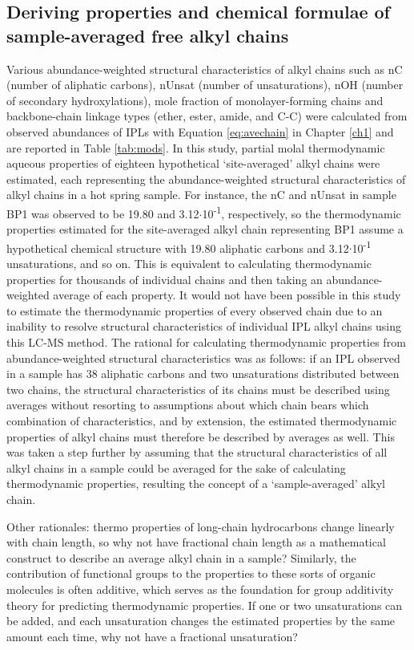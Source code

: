 \subsection{Deriving properties and chemical formulae of sample-averaged free alkyl chains}
Various abundance-weighted structural characteristics of alkyl chains such as nC (number of aliphatic carbons), nUnsat (number of unsaturations), nOH (number of secondary hydroxylations), mole fraction of monolayer-forming chains and backbone-chain linkage types (ether, ester, amide, and C-C) were calculated from observed abundances of IPLs with Equation \ref{eq:avechain} in Chapter \ref{ch1} and are reported in Table \ref{tab:mods}. In this study, partial molal thermodynamic aqueous properties of eighteen hypothetical `site-averaged' alkyl chains were estimated, each representing the abundance-weighted structural characteristics of alkyl chains in a hot spring sample. For instance, the nC and nUnsat in sample BP1 was observed to be 19.80 and 3.12$\cdot$10\textsuperscript{-1}, respectively, so the thermodynamic properties estimated for the site-averaged alkyl chain representing BP1 assume a hypothetical chemical structure with 19.80 aliphatic carbons and 3.12$\cdot$10\textsuperscript{-1} unsaturations, and so on. This is equivalent to calculating thermodynamic properties for thousands of individual chains and then taking an abundance-weighted average of each property. It would not have been possible in this study to estimate the thermodynamic properties of every observed chain due to an inability to resolve structural characteristics of individual IPL alkyl chains using this LC-MS method. The rational for calculating thermodynamic properties from abundance-weighted structural characteristics was as follows: if an IPL observed in a sample has 38 aliphatic carbons and two unsaturations distributed between two chains, the structural characteristics of its chains must be described using averages without resorting to assumptions about which chain bears which combination of characteristics, and by extension, the estimated thermodynamic properties of alkyl chains must therefore be described by averages as well. This was taken a step further by assuming that the structural characteristics of all alkyl chains in a sample could be averaged for the sake of calculating thermodynamic properties, resulting the concept of a `sample-averaged' alkyl chain.

Other rationales: thermo properties of long-chain hydrocarbons change linearly with chain length, so why not have fractional chain length as a mathematical construct to describe an average alkyl chain in a sample? Similarly, the contribution of functional groups to the properties to these sorts of organic molecules is often additive, which serves as the foundation for group additivity theory for predicting thermodynamic properties. If one or two unsaturations can be added, and each unsaturation changes the estimated properties by the same amount each time, why not have a fractional unsaturation?


